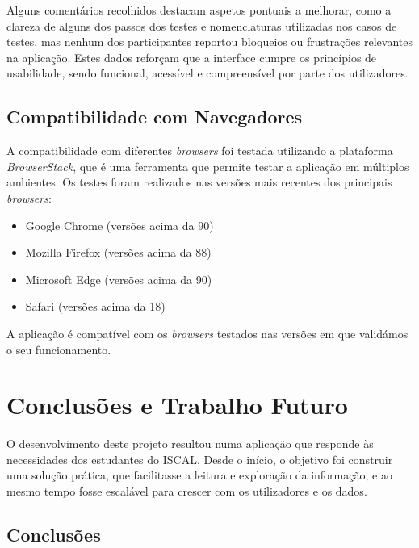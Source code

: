 Alguns comentários recolhidos destacam aspetos pontuais a melhorar, como a clareza de alguns dos passos dos testes e nomenclaturas utilizadas nos casos de testes, mas nenhum dos participantes reportou bloqueios ou frustrações relevantes na aplicação. Estes dados reforçam que a interface cumpre os princípios de usabilidade, sendo funcional, acessível e compreensível por parte dos utilizadores.

\section{Compatibilidade com Navegadores}

A compatibilidade com diferentes \textit{browsers} foi testada utilizando a plataforma \textit{BrowserStack}, que é uma ferramenta que permite testar a aplicação em múltiplos ambientes. Os testes foram realizados nas versões mais recentes dos principais \textit{browsers}:

\begin{itemize}
    \item Google Chrome (versões acima da 90)
    \item Mozilla Firefox (versões acima da 88)
    \item Microsoft Edge (versões acima da 90)
    \item Safari (versões acima da 18)
\end{itemize}

A aplicação é compatível com os \textit{browsers} testados nas versões em que validámos o seu funcionamento.

\chapter{Conclusões e Trabalho Futuro}
\label{ch:conclusoesTrabalhoFuturo}

O desenvolvimento deste projeto resultou numa aplicação que responde às necessidades dos estudantes do ISCAL. Desde o início, o objetivo foi construir uma solução prática, que facilitasse a leitura e exploração da informação, e ao mesmo tempo fosse escalável para crescer com os utilizadores e os dados.

\section{Conclusões}

